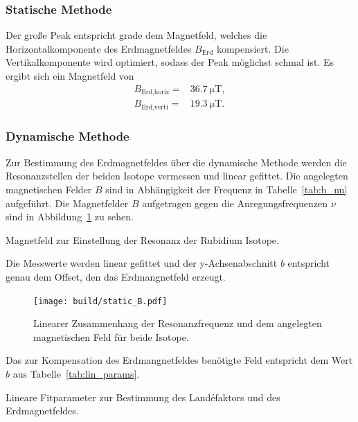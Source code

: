 \subsubsection{Statische Methode}%
\label{ssub:subsubsection_name}
Der große Peak entspricht grade dem Magnetfeld, welches die Horizontalkomponente
des Erdmagnetfeldes $B_\text{Erd}$ kompensiert.
Die Vertikalkomponente wird optimiert, sodass der Peak möglichst schmal ist.
Es ergibt sich ein Magnetfeld von
\begin{eqnarray}
	B_\text{Erd,horiz} =& \SI{36.7}{\micro\tesla}, \\
	B_\text{Erd,verti} =& \SI{19.3}{\micro\tesla}.
\end{eqnarray}

\subsubsection{Dynamische Methode}%
\label{ssub:dynamische_methode}
Zur Bestimmung des Erdmagnetfeldes über die dynamische Methode werden die
Resonanzstellen der beiden Isotope vermessen und linear gefittet.
Die angelegten magnetischen Felder $B$ sind in Abhängigkeit der Frequenz in
Tabelle~\ref{tab:b_nu} aufgeführt.
Die Magnetfelder $B$ aufgetragen gegen die Anregungsfrequenzen $\nu$ sind in
Abbildung~\ref{fig:static_B} zu sehen.
\begin{table}[h]
	\centering
	\caption{Magnetfeld zur Einstellung der Resonanz der Rubidium Isotope.}%
	\label{tab:b_nu}
		
\end{table}
Die Messwerte werden linear gefittet und der y-Achsenabschnitt $b$
entspricht genau dem Offset, den das Erdmangnetfeld erzeugt.
\begin{figure}[h]
	\centering
	\texttt{[image: build/static\_B.pdf]}
	\caption{Linearer Zusammenhang der Resonanzfrequenz und dem angelegten
	magnetischen Feld für beide Isotope.}%
	\label{fig:static_B}
\end{figure}
Das zur Kompensation des Erdmangnetfeldes benötigte Feld entspricht dem Wert $b$ aus
Tabelle~\ref{tab:lin_params}.
\begin{table}[h]
	\centering
	\caption{Lineare Fitparameter zur Bestimmung des Land\'efaktors und des
	Erdmagnetfeldes.}%
	\label{tab:lin_params}
	
\end{table}
